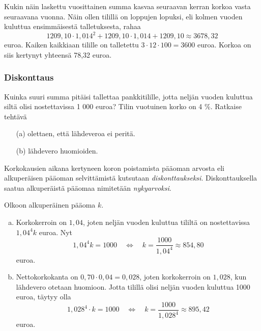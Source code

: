 \documentclass[]{beamer}
\begin{document}
\begin{frame}
    \begin{ratkaisu}
        Kukin näin laskettu vuosittainen summa kasvaa seuraavan kerran korkoa vasta seuraavana vuonna.
        \pause
        Näin ollen tilillä on loppujen lopuksi, eli kolmen vuoden kuluttua ensimmäisestä talletuksesta, rahaa \pause
        \[
            1209,10\cdot 1,014^2+1209,10\cdot1,014+1209,10\approx 3678,32
        \]
        euroa.
        \pause
        Kaiken kaikkiaan tilille on talletettu \(3\cdot12\cdot100 = 3600\) euroa.
        \pause
        Korkoa on siis kertynyt yhteensä 78,32 euroa.
    \end{ratkaisu}
\end{frame}

\begin{frame}
    \frametitle{Diskonttaus}
    \pause
    \begin{esim}
        Kuinka suuri summa pitäisi tallettaa pankkitilille, jotta neljän vuoden kuluttua siltä olisi nostettavissa 1 000 euroa? 
        Tilin vuotuinen korko on 4 \%. Ratkaise tehtävä
        \begin{enumerate}
            \item[(a)] olettaen, että lähdeveroa ei peritä.
            \item[(b)] lähdevero huomioiden.
        \end{enumerate}
    \end{esim}
    \pause
    Korkokausien aikana kertyneen koron poistamista pääoman arvosta eli alkuperäisen pääoman selvittämistä kutsutaan 
    \emph{diskonttaukseksi}.
    \pause
    Diskonttauksella saatua alkuperäistä pääomaa nimitetään \emph{nykyarvoksi}.
\end{frame}

\begin{frame}
    \begin{ratkaisu}
        Olkoon alkuperäinen pääoma \(k\).
        \begin{enumerate}[(a)]
            \item Korkokerroin on \(1,04\), joten neljän vuoden kuluttua tililtä on nostettavissa \(1,04^4k\) euroa. 
            \pause
                Nyt
                \[
                    1,04^4k = 1000\quad\Leftrightarrow\quad k = \frac{1000}{1,04^4}\approx 854,80
                \]
                euroa.
            \item Nettokorkokanta on \(0,70\cdot0,04=0,028\), joten korkokerroin on \(1,028\), kun lähdevero otetaan huomioon. \pause
                Jotta tilillä olisi neljän vuoden kuluttua 1000 euroa, täytyy olla
                \[
                    1,028^4\cdot k = 1000\quad\Leftrightarrow\quad k = \frac{1000}{1,028^4}\approx 895,42
                \]
                euroa.
        \end{enumerate}
    \end{ratkaisu}
\end{frame}
\end{document}
